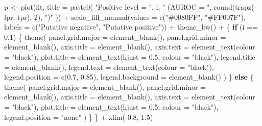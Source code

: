 \documentclass[
  11pt,
  oneside]{book}
\newenvironment{Shaded}{\begin{snugshade}}{\end{snugshade}}
\newcommand{\AttributeTok}[1]{\textcolor[rgb]{0.77,0.63,0.00}{#1}}
\newcommand{\ControlFlowTok}[1]{\textcolor[rgb]{0.13,0.29,0.53}{\textbf{#1}}}
\newcommand{\DecValTok}[1]{\textcolor[rgb]{0.00,0.00,0.81}{#1}}
\newcommand{\FloatTok}[1]{\textcolor[rgb]{0.00,0.00,0.81}{#1}}
\newcommand{\FunctionTok}[1]{\textcolor[rgb]{0.00,0.00,0.00}{#1}}
\newcommand{\NormalTok}[1]{#1}
\newcommand{\OtherTok}[1]{\textcolor[rgb]{0.56,0.35,0.01}{#1}}
\newcommand{\SpecialCharTok}[1]{\textcolor[rgb]{0.00,0.00,0.00}{#1}}
\newcommand{\StringTok}[1]{\textcolor[rgb]{0.31,0.60,0.02}{#1}}
\begin{document}
\begin{Shaded}
\begin{Highlighting}[]
\NormalTok{  p }\OtherTok{\textless{}{-}} \FunctionTok{plot}\NormalTok{(fit, }\AttributeTok{title =} \FunctionTok{paste0}\NormalTok{(}
    \StringTok{"Positive level = "}\NormalTok{, i,}
    \StringTok{" (AUROC = "}\NormalTok{, }\FunctionTok{round}\NormalTok{(}\FunctionTok{trapz}\NormalTok{(}\SpecialCharTok{{-}}\NormalTok{fpr, tpr), }\DecValTok{2}\NormalTok{), }\StringTok{")"}
\NormalTok{  )) }\SpecialCharTok{+}
    \FunctionTok{scale\_fill\_manual}\NormalTok{(}\AttributeTok{values =} \FunctionTok{c}\NormalTok{(}\StringTok{"\#0080FF"}\NormalTok{, }\StringTok{"\#FF007F"}\NormalTok{), }\AttributeTok{labels =} \FunctionTok{c}\NormalTok{(}\StringTok{"Putative negative"}\NormalTok{, }\StringTok{"Putative positive"}\NormalTok{)) }\SpecialCharTok{+}
    \FunctionTok{theme\_bw}\NormalTok{() }\SpecialCharTok{+}
\NormalTok{    \{}
      \ControlFlowTok{if}\NormalTok{ (i }\SpecialCharTok{==} \FloatTok{0.1}\NormalTok{) \{}
        \FunctionTok{theme}\NormalTok{(}
          \AttributeTok{panel.grid.major =} \FunctionTok{element\_blank}\NormalTok{(),}
          \AttributeTok{panel.grid.minor =} \FunctionTok{element\_blank}\NormalTok{(),}
          \AttributeTok{axis.title =} \FunctionTok{element\_blank}\NormalTok{(),}
          \AttributeTok{axis.text =} \FunctionTok{element\_text}\NormalTok{(}\AttributeTok{colour =} \StringTok{"black"}\NormalTok{),}
          \AttributeTok{plot.title =} \FunctionTok{element\_text}\NormalTok{(}\AttributeTok{hjust =} \FloatTok{0.5}\NormalTok{, }\AttributeTok{colour =} \StringTok{"black"}\NormalTok{),}
          \AttributeTok{legend.title =} \FunctionTok{element\_blank}\NormalTok{(),}
          \AttributeTok{legend.text =} \FunctionTok{element\_text}\NormalTok{(}\AttributeTok{colour =} \StringTok{"black"}\NormalTok{),}
          \AttributeTok{legend.position =} \FunctionTok{c}\NormalTok{(}\FloatTok{0.7}\NormalTok{, }\FloatTok{0.85}\NormalTok{),}
          \AttributeTok{legend.background =} \FunctionTok{element\_blank}\NormalTok{()}
\NormalTok{        )}
\NormalTok{      \} }\ControlFlowTok{else}\NormalTok{ \{}
        \FunctionTok{theme}\NormalTok{(}
          \AttributeTok{panel.grid.major =} \FunctionTok{element\_blank}\NormalTok{(),}
          \AttributeTok{panel.grid.minor =} \FunctionTok{element\_blank}\NormalTok{(),}
          \AttributeTok{axis.title =} \FunctionTok{element\_blank}\NormalTok{(),}
          \AttributeTok{axis.text =} \FunctionTok{element\_text}\NormalTok{(}\AttributeTok{colour =} \StringTok{"black"}\NormalTok{),}
          \AttributeTok{plot.title =} \FunctionTok{element\_text}\NormalTok{(}\AttributeTok{hjust =} \FloatTok{0.5}\NormalTok{, }\AttributeTok{colour =} \StringTok{"black"}\NormalTok{),}
          \AttributeTok{legend.position =} \StringTok{"none"}
\NormalTok{        )}
\NormalTok{      \}}
\NormalTok{    \} }\SpecialCharTok{+}
    \FunctionTok{xlim}\NormalTok{(}\SpecialCharTok{{-}}\FloatTok{0.8}\NormalTok{, }\FloatTok{1.5}\NormalTok{)}


\end{Highlighting}
\end{Shaded}
\end{document}
